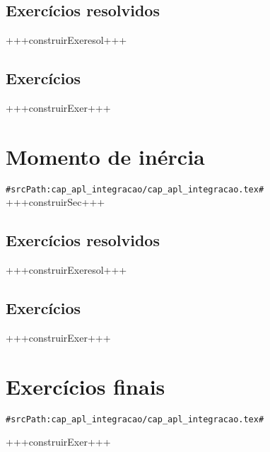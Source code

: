 \subsection*{Exercícios resolvidos}

+++construirExeresol+++


\subsection*{Exercícios}

+++construirExer+++




\section{Momento de inércia}
\verb+#srcPath:cap_apl_integracao/cap_apl_integracao.tex#+
+++construirSec+++

\subsection*{Exercícios resolvidos}

+++construirExeresol+++


\subsection*{Exercícios}

+++construirExer+++

\section{Exercícios finais}
\verb+#srcPath:cap_apl_integracao/cap_apl_integracao.tex#+


+++construirExer+++



